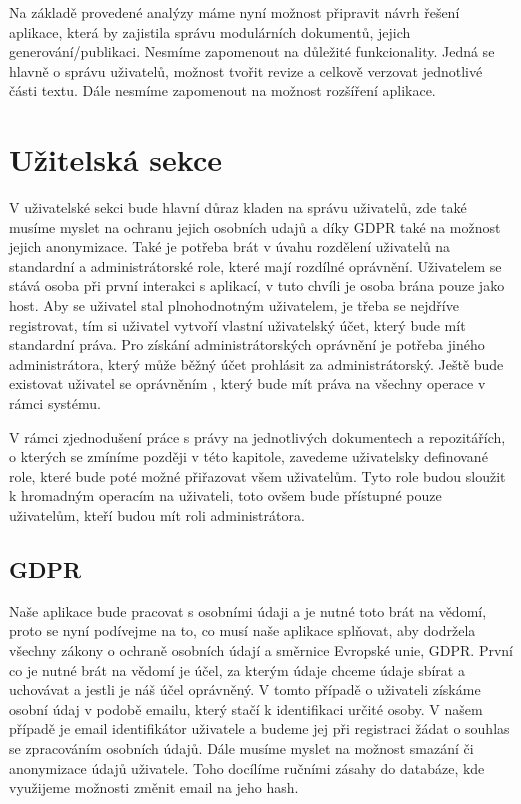 Na základě provedené analýzy máme nyní možnost připravit návrh řešení aplikace, která by zajistila správu modulárních dokumentů, jejich generování/publikaci.
Nesmíme zapomenout na důležité funkcionality. Jedná se hlavně o správu uživatelů, možnost tvořit revize a celkově verzovat jednotlivé části textu.
Dále nesmíme zapomenout na možnost rozšíření aplikace.

\section{Užitelská sekce}

V uživatelské sekci bude hlavní důraz kladen na správu uživatelů, zde také musíme myslet na ochranu jejich osobních udajů a díky GDPR také na
možnost jejich anonymizace. Také je potřeba brát v úvahu rozdělení uživatelů na standardní a administrátorské role, které mají rozdílné oprávnění.
Uživatelem se stává osoba při první interakci s aplikací, v tuto chvíli je osoba brána pouze jako host. Aby se uživatel stal plnohodnotným uživatelem,
je třeba se nejdříve registrovat, tím si uživatel vytvoří vlastní uživatelský účet, který bude mít standardní práva. Pro získání administrátorských
oprávnění je potřeba jiného administrátora, který může běžný účet prohlásit za administrátorský. Ještě bude existovat uživatel se oprávněním
, který bude mít práva na všechny operace v rámci systému.

V rámci zjednodušení práce s právy na jednotlivých dokumentech a repozitářích, o kterých se zmíníme později v této kapitole, zavedeme uživatelsky
definované role, které bude poté možné přiřazovat všem uživatelům. Tyto role budou sloužit k hromadným operacím na uživateli, toto ovšem bude
přístupné pouze uživatelům, kteří budou mít roli administrátora.

\subsection{GDPR}

Naše aplikace bude pracovat s osobními údaji a je nutné toto brát na vědomí, proto se nyní podívejme na to, co musí naše aplikace splňovat, aby dodržela všechny
zákony o ochraně osobních údají a směrnice Evropské unie, GDPR. První co je nutné brát na vědomí je účel, za kterým údaje chceme údaje sbírat a uchovávat a jestli je náš
účel oprávněný. V tomto případě o uživateli získáme osobní údaj v podobě emailu, který stačí k identifikaci určité osoby. V našem případě je email identifikátor uživatele
a budeme jej při registraci žádat o souhlas se zpracováním osobních údajů. Dále musíme myslet na možnost smazání či anonymizace údajů uživatele. Toho docílíme ručními
zásahy do databáze, kde využijeme možnosti změnit email na jeho hash. \cite{gdpr}

